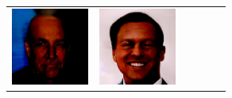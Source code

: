 \documentclass{article}
\newcommand{\pganw}{1.0in}
\begin{document}
\begin{table}[htbp]
\begin{center}
\begin{tabular}{cc|cc|cc}
\includegraphics[width=\pganw]{figures/pgan/4_base_iso_MH.png} &
\includegraphics[width=\pganw]{figures/pgan/5_base_iso_MH.png} \\

\end{tabular}
\end{center}
\end{table}
\end{document}
